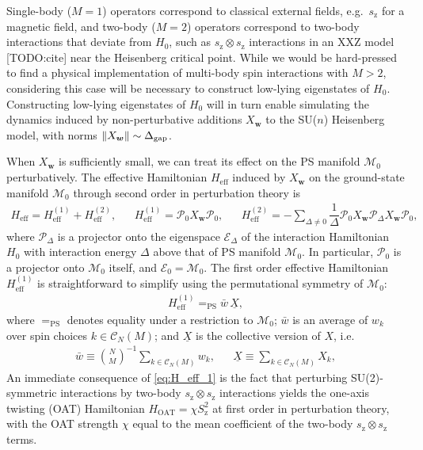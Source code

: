 \documentclass[nofootinbib,notitlepage,11pt]{revtex4-2}
\renewcommand{\t}{\text} %
\newcommand{\f}[2]{\dfrac{#1}{#2}} %
\newcommand{\p}[1]{\left(#1\right)} %
\newcommand{\m}{\bm} %
\newcommand{\1}{\mathds{1}}
\newcommand{\z}{\text{z}}
\newcommand{\C}{\mathcal{C}}
\newcommand{\E}{\mathcal{E}}
\newcommand{\M}{\mathcal{M}}
\renewcommand{\P}{\mathcal{P}}
\newcommand{\EQPS}{=_{\text{PS}}}
\newcommand{\col}{\underline}
\newcommand{\red}[1]{{\color{red} #1}}
\begin{document}
Single-body ($M=1$) operators correspond to classical external fields,
e.g.~$s_\z$ for a magnetic field, and two-body ($M=2$) operators
correspond to two-body interactions that deviate from $H_0$, such as
$s_\z\otimes s_\z$ interactions in an XXZ model\red{[TODO:cite]} near
the Heisenberg critical point.  While we would be hard-pressed to find
a physical implementation of multi-body spin interactions with $M>2$,
considering this case will be necessary to construct low-lying
eigenstates of $H_0$.  Constructing low-lying eigenstates of $H_0$
will in turn enable simulating the dynamics induced by
non-perturbative additions $X_{\m w}$ to the SU($n$) Heisenberg model,
with norms $\norm{X_{\m w}}\sim\Delta_{\t{gap}}$.

When $X_{\m w}$ is sufficiently small, we can treat its effect on the
PS manifold $\M_0$ perturbatively.  The effective Hamiltonian
$H_{\t{eff}}$ induced by $X_{\m w}$ on the ground-state manifold
$\M_0$ through second order in perturbation theory
is\cite{bravyi2011schrieffer, perlin2019effective}
\begin{align}
  H_{\t{eff}} = H_{\t{eff}}^{(1)} + H_{\t{eff}}^{(2)},
  &&
  H_{\t{eff}}^{(1)} = \P_0 X_{\m w} \P_0,
  &&
  H_{\t{eff}}^{(2)} = - \sum_{\Delta\ne0}
  \f1\Delta \P_0 X_{\m w} \P_\Delta X_{\m w} \P_0,
  \label{eq:H_eff}
\end{align}
where $\P_\Delta$ is a projector onto the eigenspace $\E_\Delta$ of
the interaction Hamiltonian $H_0$ with interaction energy $\Delta$
above that of PS manifold $\M_0$.  In particular, $\P_0$ is a
projector onto $\M_0$ itself, and $\E_0=\M_0$.  The first order
effective Hamiltonian $H_{\t{eff}}^{(1)}$ is straightforward to
simplify using the permutational symmetry of $\M_0$:
\begin{align}
  H_{\t{eff}}^{(1)} \EQPS \bar w\,\col{X},
  \label{eq:H_eff_1}
\end{align}
where $\EQPS$ denotes equality under a restriction to $\M_0$; $\bar w$
is an average of $w_k$ over spin choices $k\in\C_N\p{M}$; and
$\col{X}$ is the collective version of $X$, i.e.
\begin{align}
  \bar w \equiv { N \choose M }^{-1} \sum_{k\in\C_N\p{M}} w_k,
  &&
  \col{X} \equiv \sum_{k\in\C_N\p{M}} X_k,
\end{align}
An immediate consequence of \eqref{eq:H_eff_1} is the fact that
perturbing SU(2)-symmetric interactions by two-body $s_\z\otimes s_\z$
interactions yields the one-axis twisting (OAT)
Hamiltonian\cite{kitagawa1993squeezed, ma2011quantum}
$H_{\t{OAT}}=\chi S_\z^2$ at first order in perturbation theory, with
the OAT strength $\chi$ equal to the mean coefficient of the two-body
$s_\z\otimes s_\z$ terms.
\end{document}
